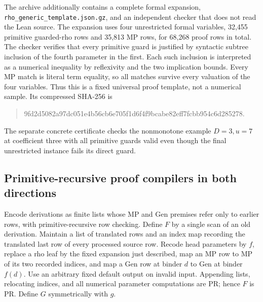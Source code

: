 The archive additionally contains a complete formal expansion,
\texttt{rho\_generic\_template.json.gz}, and an independent checker that
does not read the Lean source.  The expansion uses four unrestricted
formal variables, 32,455 primitive guarded-rho rows and 35,813 MP rows,
for 68,268 proof rows in total.  The checker verifies that every
primitive guard is justified by syntactic subtree inclusion of the
fourth parameter in the first.  Each such inclusion is interpreted as
a numerical inequality by reflexivity and the two implication bounds.
Every MP match is literal term equality, so all matches survive every
valuation of the four variables.  Thus this is a fixed universal proof
template, not a numerical sample.  Its compressed SHA-256 is
\begin{quote}\small\ttfamily
9fd2d5082a97dc051e4b56cb6e705f1d6f4f9bcabe82eff7fcbb954c6d285278.
\end{quote}
The separate concrete certificate checks the nonmonotone example
$D=3,u=7$ at coefficient three with all primitive guards valid even
though the final unrestricted instance fails its direct guard.

\subsection{Primitive-recursive proof compilers in both directions}

Encode derivations as finite lists whose MP and Gen premises refer only
to earlier rows, with primitive-recursive row checking.  Define $F$ by a
single scan of an old derivation.  Maintain a list of translated rows and
an index map recording the translated last row of every processed source
row.  Recode head parameters by $f$, replace a rho leaf by the fixed
expansion just described, map an MP row to MP of its two recorded indices,
and map a Gen row at binder $d$ to Gen at binder $f(d)$.  Use an arbitrary
fixed default output on invalid input.  Appending lists, relocating indices,
and all numerical parameter computations are PR; hence $F$ is PR.
Define $G$ symmetrically with $g$.

